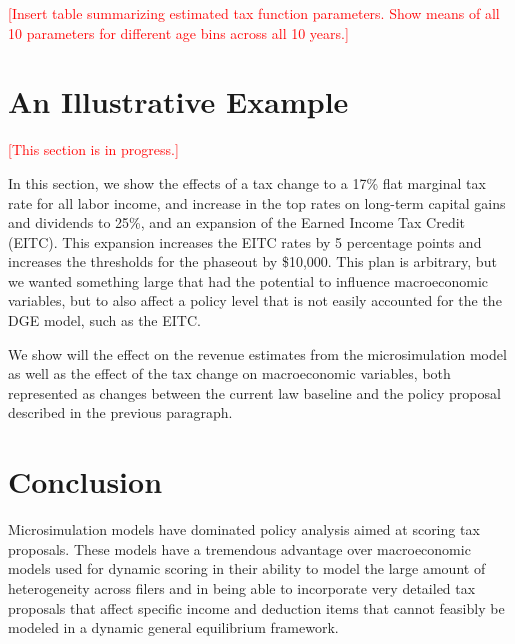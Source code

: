 \documentclass[letterpaper,12pt]{article}
\theoremstyle{definition}
\begin{document}
\begin{spacing}{1.5}
    \noindent\textcolor{red}{[Insert table summarizing estimated tax function parameters. Show means of all 10 parameters for different age bins across all 10 years.]}


%


\section{An Illustrative Example}\label{SecResults}

  \noindent\textcolor{red}{[This section is in progress.]}
  
  In this section, we show the effects of a tax change to a 17\% flat marginal tax rate for all labor income, and increase in the top rates on long-term capital gains and dividends to 25\%, and an expansion of the Earned Income Tax Credit (EITC).  This expansion increases the EITC rates by 5  percentage points and increases the thresholds for the phaseout by \$10,000.  This plan is arbitrary, but we wanted something large that had the potential to influence macroeconomic variables, but to also affect a policy level that is not easily accounted for the the DGE model, such as the EITC.  
  
 We show will the effect on the revenue estimates from the microsimulation model as well as the effect of the tax change on macroeconomic variables, both represented as changes between the current law baseline and the policy proposal described in the previous paragraph.




\section{Conclusion}\label{SecConclusion}

  Microsimulation models have dominated policy analysis aimed at scoring tax proposals.  These models have a tremendous advantage over macroeconomic models used for dynamic scoring in their ability to model the large amount of heterogeneity across filers and in being able to incorporate very detailed tax proposals that affect specific income and deduction items that cannot feasibly be modeled in a dynamic general equilibrium framework.


\end{spacing}
\end{document}
